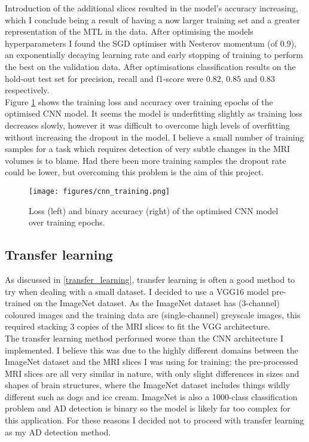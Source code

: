 \documentclass[
    author={Kai Hulme},
    supervisor={Dr Jon Bird},
    degree={BSc},
    title={Generative Adversarial Networks as an Augmentation Technique},
    subtitle={for Alzheimer's Disease Detection in MRI Volumes},
    type={Research},
    year={2021} 
]{dissertation}
\begin{document}
Introduction of the additional slices resulted in the model's accuracy increasing, which I conclude being a result of having a now larger training set and a greater representation of the MTL in the data. After optimising the models hyperparameters I found the SGD optimiser with Nesterov momentum (of 0.9), an exponentially decaying learning rate and early stopping of training to perform the best on the validation data. After optimisations classification results on the hold-out test set for precision, recall and f1-score were $0.82$, $0.85$ and $0.83$ respectively. \\

Figure \ref{training_loss_curve} shows the training loss and accuracy over training epochs of the optimised CNN model. It seems the model is underfitting slightly as training loss decreases slowly, however it was difficult to overcome high levels of overfitting without increasing the dropout in the model. I believe a small number of training samples for a task which requires detection of very subtle changes in the MRI volumes is to blame. Had there been more training samples the dropout rate could be lower, but overcoming this problem is the aim of this project.

\begin{figure}[t]
    \centering
    \texttt{[image: figures/cnn\_training.png]}
    \caption{Loss (left) and binary accuracy (right) of the optimised CNN model over training epochs.}
    \label{training_loss_curve}
\end{figure}

\subsection{Transfer learning}

As discussed in \ref{transfer_learning}, transfer learning is often a good method to try when dealing with a small dataset. I decided to use a VGG16 model pre-trained on the ImageNet dataset. As the ImageNet dataset has (3-channel) coloured images and the training data are (single-channel) greyscale images, this required stacking 3 copies of the MRI slices to fit the VGG architecture. \\
	
The transfer learning method performed worse than the CNN architecture I implemented. I believe this was due to the highly different domains between the ImageNet dataset and the MRI slices I was using for training; the pre-processed MRI slices are all very similar in nature, with only slight differences in sizes and shapes of brain structures, where the ImageNet dataset includes things wildly different such as dogs and ice cream. ImageNet is also a 1000-class classification problem and AD detection is binary so the model is likely far too complex for this application. For these reasons I decided not to proceed with transfer learning as my AD detection method.
\end{document}
